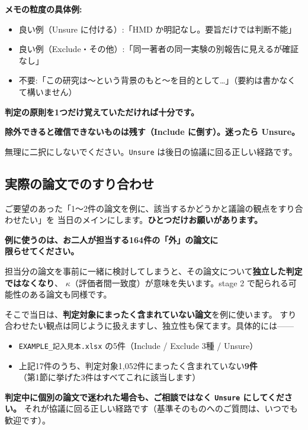 \documentclass[a4paper]{ltjsarticle}
\newcommand{\keybox}[1]{%
  \par\medskip
  \noindent\colorbox{soft}{%
    \begin{minipage}{\dimexpr\linewidth-2\fboxsep\relax}
      \vspace{2pt}\centering\bfseries\large #1\vspace{4pt}
    \end{minipage}}%
  \par\medskip}
\newcommand{\notebox}[1]{%
  \par\medskip
  \noindent\colorbox{warn}{%
    \begin{minipage}{\dimexpr\linewidth-2\fboxsep\relax}
      \vspace{4pt}#1\vspace{4pt}
    \end{minipage}}%
  \par\medskip}
\begin{document}
\noindent
\textbf{メモの粒度の具体例:}

\begin{itemize}
  \item 良い例（Unsure に付ける）:「HMD か明記なし。要旨だけでは判断不能」
  \item 良い例（Exclude・その他）:「同一著者の同一実験の別報告に見えるが確証なし」
  \item 不要:「この研究は〜という背景のもと〜を目的として\ldots」（要約は書かなくて構いません）
\end{itemize}

\noindent
\textbf{判定の原則を1つだけ覚えていただければ十分です。}

\keybox{除外できると確信できないものは残す（Include に倒す）。迷ったら Unsure。}

\noindent
無理に二択にしないでください。\texttt{Unsure} は後日の協議に回る正しい経路です。

\subsection{実際の論文でのすり合わせ}

ご要望のあった「1〜2件の論文を例に、該当するかどうかと議論の観点をすり合わせたい」を
当日のメインにします。\textbf{ひとつだけお願いがあります。}

\keybox{例に使うのは、お二人が担当する164件の「外」の論文に\\ 限らせてください。}

\noindent
担当分の論文を事前に一緒に検討してしまうと、その論文について\textbf{独立した判定ではなくなり}、
$\kappa$（評価者間一致度）が意味を失います。stage 2 で配られる可能性のある論文も同様です。

\medskip
\noindent
そこで当日は、\textbf{判定対象にまったく含まれていない論文}を例に使います。
すり合わせたい観点は同じように扱えますし、独立性も保てます。具体的には——

\begin{itemize}
  \item \texttt{EXAMPLE\_記入見本.xlsx} の5件（Include / Exclude 3種 / Unsure）
  \item 上記17件のうち、判定対象1,052件にまったく含まれていない\textbf{9件}\\（第1節に挙げた3件はすべてこれに該当します）
\end{itemize}

\notebox{\textbf{判定中に個別の論文で迷われた場合も、ご相談ではなく \texttt{Unsure} にしてください。}
それが協議に回る正しい経路です（基準そのものへのご質問は、いつでも歓迎です）。}
\end{document}
